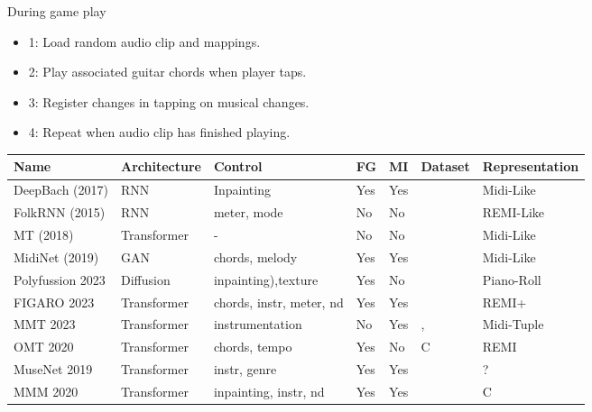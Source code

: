 During game play
\begin{itemize}
    \item{1}: Load random audio clip and mappings.
    \item{2}: Play associated guitar chords when player taps.
    \item{3}: Register changes in tapping on musical changes.
    \item{4}: Repeat when audio clip has finished playing.
\end{itemize}

\begin{table}[H]
\label{table:bigtable}
    \centering
    \begin{tabular}{|l|l|l|l|l|l|l|}
        \hline
        \textbf{Name} & \textbf{Architecture} & \textbf{Control} & \textbf{FG} & \textbf{MI} & \textbf{Dataset} & \textbf{Representation} \\
        \hline
        DeepBach (2017) \cite{Hadjeres_Pachet_Nielsen_2017} & RNN & Inpainting & Yes & Yes & \cite{jsbchorales} & Midi-Like\\ 
        FolkRNN (2015) \cite{Sturm_Ben-Tal_2016} & RNN & meter, mode & No & No & \cite{sessionfolkdata} & REMI-Like\\
        MT (2018) \cite{Huang_Vaswani_Uszkoreit_Shazeer_Simon_Hawthorne_Dai_Hoffman_Dinculescu_Eck_2018} & Transformer & - & No & No & \cite{hawthorne2018maestro} \cite{jsbchorales} & Midi-Like\\
        MidiNet (2019) \cite{midinet} & GAN & chords, melody & Yes & Yes & \cite{hooktheorypopmidi} & Midi-Like\\
        Polyfussion 2023 \cite{Min_Jiang_Xia_Zhao_polyffusion_2023} & Diffusion &inpainting),texture & Yes & No & \cite{Wang_Chen_pop90_dataset} & Piano-Roll\\
        FIGARO 2023 \cite{Rütte_figaro_2023} & Transformer & chords, instr, meter, nd & Yes & Yes & \cite{Raffel_2016} & REMI+ \\
        MMT 2023 \cite{Dong_Chen_MMT_Kirkpatrick_2023} & Transformer & instrumentation & No & Yes & \cite{Raffel_2016},\cite{Crestel_OrchestralDataset} & Midi-Tuple \\
        OMT 2020 \cite{Huang_Yang_remi_pop_transformer_2020} & Transformer & chords, tempo & Yes & No & C & REMI\\
        MuseNet 2019 \cite{Christine_2019} & Transformer & instr, genre & Yes & Yes & \cite{hawthorne2018maestro}\cite{classicalarchives}\cite{bitmidi} & ?\\
        MMM 2020 \cite{Ens_Pasquier_2020_MMM} & Transformer & inpainting, instr, nd & Yes & Yes & \cite{Raffel_2016} & C\\

\end{tabular}
\end{table}

